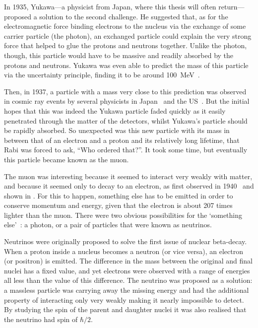 In 1935, Yukawa---a physicist from Japan, where this thesis will often return---proposed a solution to the second challenge.
He suggested that, as for the electromagnetic force binding electrons to the nucleus via the exchange of some carrier particle (the photon), 
an exchanged particle could explain the very strong force that helped to glue the protons and neutrons together.
Unlike the photon, though, this particle would have to be massive and readily absorbed by the protons and neutrons.
Yukawa was even able to predict the mass of this particle via the uncertainty principle, finding it to be around 100~MeV~\cite{Yukawa:1935xg}.

\FigTheoryMuonDecayCloudChamber
Then, in 1937, a particle with a mass very close to this prediction was observed in cosmic ray events by several physicists in Japan~\cite{Nishina193712} and the US~\cite{Neddermeyer1937md,Street193711}.
But the initial hopes that this was indeed the Yukawa particle faded quickly as it easily penetrated through the matter of the detectors, whilst Yukawa's particle should be rapidly absorbed.
So unexpected was this new particle with its mass in between that of an electron and a proton and its relatively long lifetime, that Rabi was forced to ask, ``Who ordered that?''.
It took some time, but eventually this particle became known as the muon.

The muon was interesting because it seemed to interact very weakly with matter, and because it seemed only to decay to an electron, as first observed in 1940~\cite{Williams1940102} and shown in .
For this to happen, something else has to be emitted in order to conserve momentum and energy, given that the electron is about 207 times lighter than the muon.
There were two obvious possibilities for the `something else'~\cite{Pontecorvo:1947vp}: a photon, or a pair of particles that were known as neutrinos.

Neutrinos were originally proposed to solve the first issue of nuclear beta-decay.
When a proton inside a nucleus becomes a neutron (or vice versa), an electron (or positron) is emitted.
The difference in the mass between the original and final nuclei has a fixed value, and yet electrons were observed with a range of energies all less than the value of this difference.
The neutrino was proposed as a solution: a massless particle was carrying away the missing energy and had the additional property of interacting only very weakly making it nearly impossible to detect.
By studying the spin of the parent and daughter nuclei it was also realised that the neutrino had spin of $\hbar/2$.
\FigTheoryHincksPontecorvoMuEGamma

